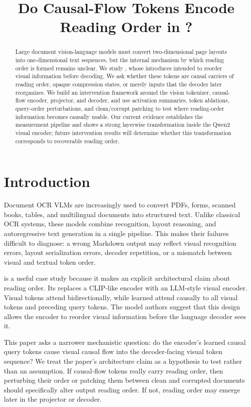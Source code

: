 \documentclass{article}
\title{Do Causal-Flow Tokens Encode Reading Order in \modelname?}
\author{\todo{Author names}}
\date{}
\begin{document}
\maketitle

\begin{abstract}
Large document vision-language models must convert two-dimensional page layouts into one-dimensional text sequences, but the internal mechanism by which reading order is formed remains unclear. We study \modelname, whose \encodername{} introduces \flowtokens{} intended to reorder visual information before decoding. We ask whether these tokens are causal carriers of reading order, opaque compression states, or merely inputs that the decoder later reorganizes. We build an intervention framework around the vision tokenizer, causal-flow encoder, projector, and decoder, and use activation summaries, token ablations, query-order perturbations, and clean/corrupt patching to test where reading-order information becomes causally usable. Our current evidence establishes the measurement pipeline and shows a strong layerwise transformation inside the Qwen2 visual encoder; future intervention results will determine whether this transformation corresponds to recoverable reading order.
\end{abstract}

\section{Introduction}

Document OCR VLMs are increasingly used to convert PDFs, forms, scanned books, tables, and multilingual documents into structured text. Unlike classical OCR systems, these models combine recognition, layout reasoning, and autoregressive text generation in a single pipeline. This makes their failures difficult to diagnose: a wrong Markdown output may reflect visual recognition errors, layout serialization errors, decoder repetition, or a mismatch between visual and textual token order.

\modelname{} is a useful case study because it makes an explicit architectural claim about reading order. Its \encodername{} replaces a CLIP-like encoder with an LLM-style visual encoder. Visual tokens attend bidirectionally, while learned \flowtokens{} attend causally to all visual tokens and preceding query tokens. The model authors suggest that this design allows the encoder to reorder visual information before the language decoder sees it.

This paper asks a narrower mechanistic question: do the encoder's learned causal query tokens cause visual causal flow into the decoder-facing visual token sequence? We treat the paper's architecture claim as a hypothesis to test rather than an assumption. If causal-flow tokens really carry reading order, then perturbing their order or patching them between clean and corrupted documents should specifically alter output reading order. If not, reading order may emerge later in the projector or decoder.
\end{document}
